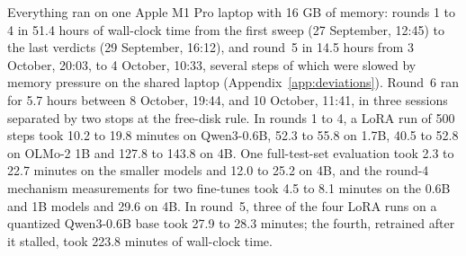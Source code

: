 \documentclass[10pt]{article}
\begin{document}
Everything ran on one Apple M1 Pro laptop with 16 GB of memory: rounds 1 to 4 in 51.4 hours of wall-clock time from the first sweep (27 September, 12:45) to the last verdicts (29 September, 16:12), and round~5 in 14.5 hours from 3 October, 20:03, to 4 October, 10:33, several steps of which were slowed by memory pressure on the shared laptop (Appendix~\ref{app:deviations}). Round~6 ran for 5.7 hours between 8 October, 19:44, and 10 October, 11:41, in three sessions separated by two stops at the free-disk rule. In rounds 1 to 4, a LoRA run of 500 steps took 10.2 to 19.8 minutes on Qwen3-0.6B, 52.3 to 55.8 on 1.7B, 40.5 to 52.8 on OLMo-2 1B and 127.8 to 143.8 on 4B. One full-test-set evaluation took 2.3 to 22.7 minutes on the smaller models and 12.0 to 25.2 on 4B, and the round-4 mechanism measurements for two fine-tunes took 4.5 to 8.1 minutes on the 0.6B and 1B models and 29.6 on 4B. In round~5, three of the four LoRA runs on a quantized Qwen3-0.6B base took 27.9 to 28.3 minutes; the fourth, retrained after it stalled, took 223.8 minutes of wall-clock time.
\end{document}
